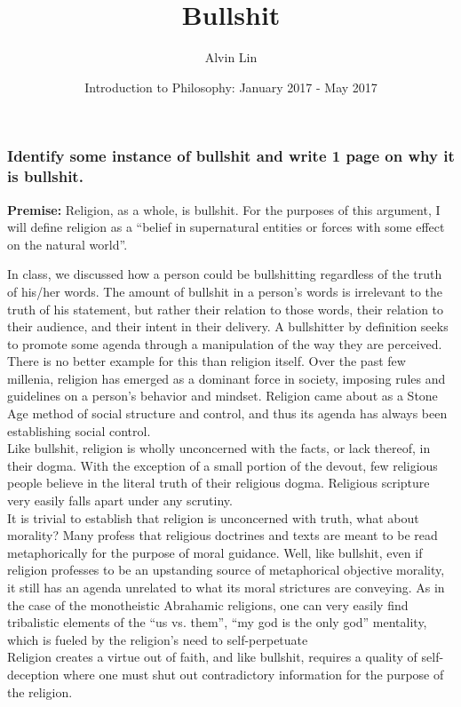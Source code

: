 \documentclass[letterpaper, 12pt]{article}
\title{Bullshit}
\author{Alvin Lin}
\date{Introduction to Philosophy: January 2017 - May 2017}
\begin{document}
\maketitle

\subsubsection*{Identify some instance of bullshit and write 1 page on why it
is bullshit.}

\textbf{Premise:} Religion, as a whole, is bullshit. For the purposes of this
argument, I will define religion as a ``belief in supernatural entities or
forces with some effect on the natural world''.

In class, we discussed how a person could be bullshitting regardless of the
truth of his/her words. The amount of bullshit in a person's words is irrelevant
to the truth of his statement, but rather their relation to those words, their
relation to their audience, and their intent in their delivery. A bullshitter
by definition seeks to promote some agenda through a manipulation of the
way they are perceived. \\
There is no better example for this than religion itself. Over the past few
millenia, religion has emerged as a dominant force in society, imposing rules
and guidelines on a person's behavior and mindset. Religion came about as a
Stone Age method of social structure and control, and thus its agenda has
always been establishing social control. \\
Like bullshit, religion is wholly unconcerned with the facts, or lack
thereof, in their dogma. With the exception of a small portion of the devout,
few religious people believe in the literal truth of their religious dogma.
Religious scripture very easily falls apart under any scrutiny. \\
It is trivial to establish that religion is unconcerned with truth, what about
morality? Many profess that religious doctrines and texts are meant to be read
metaphorically for the purpose of moral guidance. Well, like bullshit, even if
religion professes to be an upstanding source of metaphorical objective
morality, it still has an agenda unrelated to what its moral strictures are
conveying. As in the case of the monotheistic Abrahamic religions, one can very
easily find tribalistic elements of the ``us vs. them'', ``my god is the only
god'' mentality, which is fueled by the religion's need to self-perpetuate \\
Religion creates a virtue out of faith, and like bullshit, requires a quality
of self-deception where one must shut out contradictory information for the
purpose of the religion.
\end{document}
